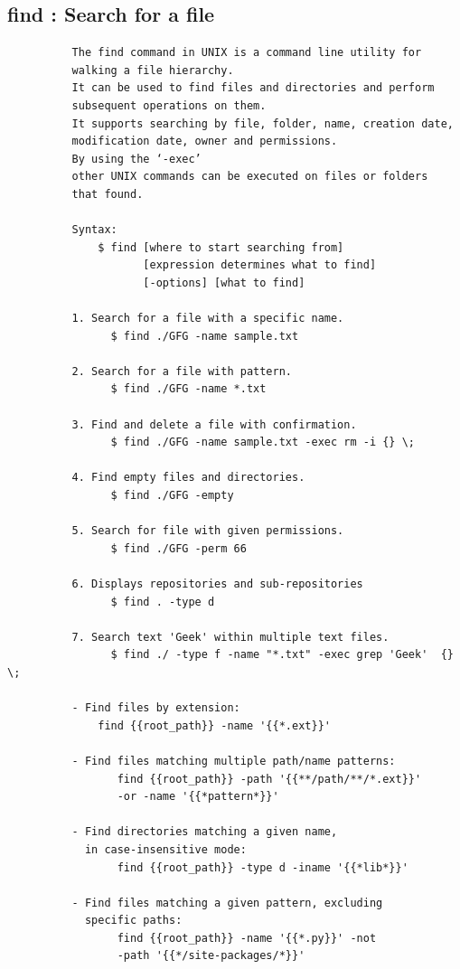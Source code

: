 \documentclass[a4paper,12pt]{article}
\begin{document}
\subsection{find  : Search for a file}
\begin{verbatim}
          The find command in UNIX is a command line utility for
          walking a file hierarchy. 
          It can be used to find files and directories and perform   
          subsequent operations on them. 
          It supports searching by file, folder, name, creation date,   
          modification date, owner and permissions. 
          By using the ‘-exec’ 
          other UNIX commands can be executed on files or folders 
          that found. 

          Syntax: 
              $ find [where to start searching from]
                     [expression determines what to find] 
                     [-options] [what to find]

          1. Search for a file with a specific name.
                $ find ./GFG -name sample.txt

          2. Search for a file with pattern.
                $ find ./GFG -name *.txt

          3. Find and delete a file with confirmation.
                $ find ./GFG -name sample.txt -exec rm -i {} \; 

          4. Find empty files and directories.
                $ find ./GFG -empty

          5. Search for file with given permissions.
                $ find ./GFG -perm 66

          6. Displays repositories and sub-repositories
                $ find . -type d

          7. Search text 'Geek' within multiple text files.
                $ find ./ -type f -name "*.txt" -exec grep 'Geek'  {} \;
          
          - Find files by extension:
              find {{root_path}} -name '{{*.ext}}'

          - Find files matching multiple path/name patterns:
                 find {{root_path}} -path '{{**/path/**/*.ext}}' 
                 -or -name '{{*pattern*}}'

          - Find directories matching a given name,
            in case-insensitive mode:
                 find {{root_path}} -type d -iname '{{*lib*}}'

          - Find files matching a given pattern, excluding
            specific paths:
                 find {{root_path}} -name '{{*.py}}' -not 
                 -path '{{*/site-packages/*}}'


\end{verbatim}
\end{document}
